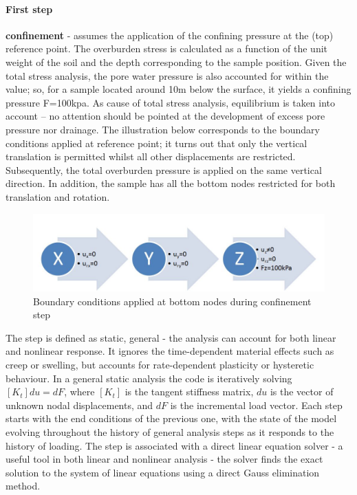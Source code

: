 \documentclass[11pt,a4paper]{report}
\begin{document}
\paragraph{First step}
\textbf{confinement }- assumes the application of the confining pressure at the (top) reference point. The overburden stress is calculated as a function of the unit weight of the soil and the depth corresponding to the sample position. Given the total stress analysis, the pore water pressure is also accounted for within the value; so, for a sample located around 10m below the surface, it yields a confining pressure F=100kpa. As cause of total stress analysis, equilibrium is taken into account – no attention should be pointed at the development of excess pore pressure nor drainage. The illustration below corresponds to the boundary conditions applied at reference point; it turns out that only the vertical translation is permitted whilst all other displacements are restricted. Subsequently, the total overburden pressure is applied on the same vertical direction. In addition, the sample has all the bottom nodes restricted for both translation and rotation. 

\begin{figure}[h!]
	\centering
	\includegraphics[width=0.6\linewidth]{"bc1d"}
	\caption{Boundary conditions applied at bottom nodes during confinement step}
	\label{bc1}
\end{figure}

The step is defined as static, general - the analysis can account for both linear and nonlinear response. It ignores the time-dependent material effects such as creep or swelling, but accounts for rate-dependent plasticity or hysteretic behaviour. In a general static analysis the code is iteratively solving $[K_t]{du}= {dF}$, where $[K_t]$ is the tangent stiffness matrix, ${du}$ is the vector of unknown nodal displacements, and ${dF}$ is the incremental load vector. Each step starts with the end conditions of the previous one, with the state of the model evolving throughout the history of general analysis steps as it responds to the history of loading. The step is associated with a direct linear equation solver - a useful tool in both linear and nonlinear analysis - the solver finds the exact solution to the system of linear equations using a direct Gauss elimination method. 
\end{document}
